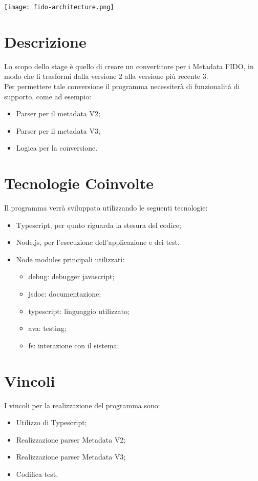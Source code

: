     \begin{center}
        \texttt{[image: fido-architecture.png]}
    \end{center}

\section{Descrizione}


Lo scopo dello stage è quello di creare un convertitore per i Metadata FIDO, in modo che li trasformi dalla versione 2 alla versione più recente 3. \\

Per permettere tale conversione il programma necessiterà di funzionalità di supporto, come ad esempio:\begin{itemize}
    \item Parser per il metadata V2;
    \item Parser per il metadata V3;
    \item Logica per la conversione.
\end{itemize}
 
\section{Tecnologie Coinvolte}
Il programma verrà sviluppato utilizzando le seguenti tecnologie:\begin{itemize}
    \item Typescript, per qunto riguarda la stesura del codice;
    \item Node.js, per l'esecuzione dell'applicazione e dei test.
    \item Node modules principali utilizzati: \begin{itemize}
        \item debug: debugger javascript;
        \item jsdoc: documentazione;
        \item typescript: linguaggio utilizzato;
        \item ava: testing;
        \item fs: interazione con il sistema;
    \end{itemize}
\end{itemize}

\section{Vincoli}
I vincoli per la realizzazione del programma sono:\begin{itemize}
    \item Utilizzo di Typescript;
    \item Realizzazione parser Metadata V2;
    \item Realizzazione parser Metadata V3;
    \item Codifica test.
\end{itemize}

